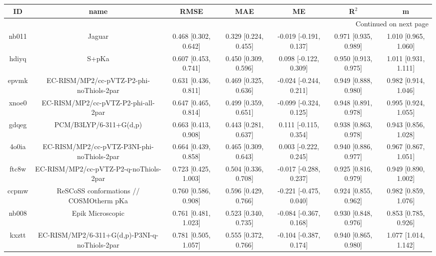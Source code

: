 \documentclass{article}
\begin{document}
\begin{center}
\begin{longtable}{|ccccccc|}
\toprule
    ID &                                               name &                  RMSE &                   MAE &                      ME &                 R$^2$ &                      m \\
\midrule
\endhead
\midrule
\multicolumn{7}{r}{{Continued on next page}} \\
\midrule
\endfoot

\bottomrule
\endlastfoot
 nb011 &                                             Jaguar &  0.468 [0.302, 0.642] &  0.329 [0.224, 0.455] &  -0.019 [-0.191, 0.137] &  0.971 [0.935, 0.989] &   1.010 [0.965, 1.060] \\
 hdiyq &                                              S+pKa &  0.607 [0.453, 0.741] &  0.450 [0.309, 0.596] &   0.098 [-0.122, 0.309] &  0.950 [0.913, 0.975] &   1.011 [0.931, 1.111] \\
 epvmk &           EC-RISM/MP2/cc-pVTZ-P2-phi-noThiols-2par &  0.631 [0.436, 0.811] &  0.469 [0.325, 0.636] &  -0.024 [-0.244, 0.211] &  0.949 [0.888, 0.980] &   0.982 [0.914, 1.046] \\
 xnoe0 &                EC-RISM/MP2/cc-pVTZ-P2-phi-all-2par &  0.647 [0.465, 0.814] &  0.499 [0.359, 0.651] &  -0.099 [-0.324, 0.125] &  0.948 [0.891, 0.978] &   0.995 [0.924, 1.055] \\
 gdqeg &                             PCM/B3LYP/6-311+G(d,p) &  0.663 [0.413, 0.908] &  0.443 [0.281, 0.637] &   0.111 [-0.115, 0.354] &  0.938 [0.863, 0.978] &   0.943 [0.856, 1.028] \\
 4o0ia &         EC-RISM/MP2/cc-pVTZ-P3NI-phi-noThiols-2par &  0.664 [0.439, 0.858] &  0.465 [0.309, 0.643] &   0.003 [-0.222, 0.245] &  0.940 [0.886, 0.977] &   0.967 [0.867, 1.051] \\
 ftc8w &             EC-RISM/MP2/cc-pVTZ-P2-q-noThiols-2par &  0.723 [0.425, 1.003] &  0.504 [0.336, 0.708] &  -0.017 [-0.288, 0.237] &  0.925 [0.816, 0.979] &   0.949 [0.890, 1.002] \\
 ccpmw &            ReSCoSS conformations // COSMOtherm pKa &  0.760 [0.586, 0.908] &  0.596 [0.429, 0.766] &  -0.221 [-0.475, 0.040] &  0.924 [0.855, 0.962] &   0.982 [0.859, 1.076] \\
 nb008 &                                   Epik Microscopic &  0.761 [0.481, 1.023] &  0.523 [0.340, 0.735] &  -0.084 [-0.367, 0.168] &  0.930 [0.848, 0.976] &   0.853 [0.785, 0.926] \\
 kxztt &      EC-RISM/MP2/6-311+G(d,p)-P3NI-q-noThiols-2par &  0.781 [0.505, 1.057] &  0.555 [0.372, 0.766] &  -0.104 [-0.387, 0.174] &  0.940 [0.865, 0.980] &   1.077 [1.014, 1.142] \\

\end{longtable}
\end{center}
\end{document}

